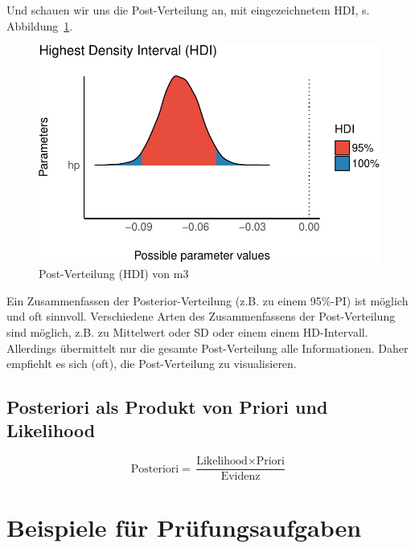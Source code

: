 \documentclass[
  a4paper,
  DIV=11]{scrreprt}
\theoremstyle{definition}
\theoremstyle{remark}
\begin{document}
Und schauen wir uns die Post-Verteilung an, mit eingezeichnetem HDI, s.
Abbildung~\ref{fig-post-m3}.

\begin{figure}

{\centering \includegraphics{./abschluss_files/figure-pdf/fig-post-m3-1.pdf}

}

\caption{\label{fig-post-m3}Post-Verteilung (HDI) von m3}

\end{figure}

Ein Zusammenfassen der Posterior-Verteilung (z.B. zu einem 95\%-PI) ist
möglich und oft sinnvoll. Verschiedene Arten des Zusammenfassens der
Post-Verteilung sind möglich, z.B. zu Mittelwert oder SD oder einem
einem HD-Intervall. Allerdings übermittelt nur die gesamte
Post-Verteilung alle Informationen. Daher empfiehlt es sich (oft), die
Post-Verteilung zu visualisieren.

\hypertarget{posteriori-als-produkt-von-priori-und-likelihood-1}{%
\subsection{Posteriori als Produkt von Priori und
Likelihood}\label{posteriori-als-produkt-von-priori-und-likelihood-1}}

\[\text{Posteriori} = \frac{\text{Likelihood} \times \text{Priori}}{\text{Evidenz}}\]

\hypertarget{beispiele-fuxfcr-pruxfcfungsaufgaben}{%
\section{Beispiele für
Prüfungsaufgaben}\label{beispiele-fuxfcr-pruxfcfungsaufgaben}}
\end{document}
